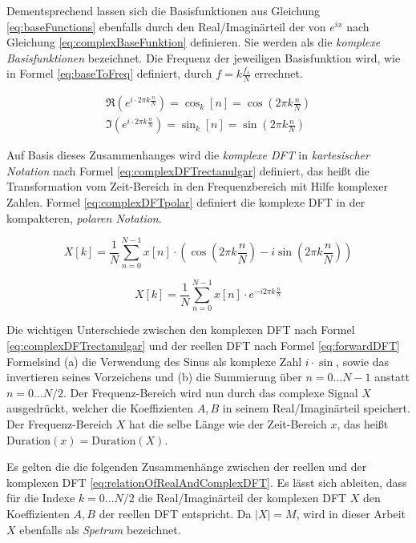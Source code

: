 Dementsprechend lassen sich die Basisfunktionen aus Gleichung \ref{eq:baseFunctions} ebenfalls durch den Real/Imaginärteil der von $e^{ix}$ nach Gleichung \ref{eq:complexBaseFunktion} definieren. Sie werden als die \emph{komplexe Basisfunktionen} bezeichnet. Die Frequenz der jeweiligen Basisfunktion wird, wie in Formel \ref{eq:baseToFreq} definiert, durch  $f = k\frac{f_s}{N}$ errechnet. 

\begin{equation}
\begin{gathered}
\Re(e^{i\cdot 2\pi k \frac{n}{N}}) = \cos_k[n] = \cos(2\pi k \frac{n}{N}) \\
\Im(e^{i\cdot 2\pi k \frac{n}{N}}) = \sin_k[n] = \sin(2\pi k \frac{n}{N})
\end{gathered}
\label{eq:complexBaseFunktion}
\end{equation}

Auf Basis dieses Zusammenhanges wird die \emph{komplexe DFT} in \emph{kartesischer Notation} nach Formel \ref{eq:complexDFTrectanulgar} definiert, das heißt die Transformation vom Zeit-Bereich in den Frequenzbereich mit Hilfe komplexer Zahlen. Formel \ref{eq:complexDFTpolar} definiert die komplexe DFT in der kompakteren, \emph{polaren Notation}. \cite[S. 570]{dspGuide}

\begin{equation}
\label{eq:complexDFTrectanulgar}
X[k] = \frac{1}{N} \sum_{n = 0}^{N-1}  x[n] \cdot (\cos (2\pi k \frac{n}{N}) -i \sin (2 \pi k \frac{n}{N}) )
\end{equation}

\begin{equation}
\label{eq:complexDFTpolar}
X[k] =  \frac{1}{N} \sum_{n = 0}^{N-1}  x[n] \cdot e^{-i 2\pi k \frac{n}{N}}
\end{equation}

Die wichtigen Unterschiede zwischen den komplexen DFT nach Formel  \ref{eq:complexDFTrectanulgar} und der reellen DFT nach Formel \ref{eq:forwardDFT} Formelsind (a) die Verwendung des Sinus als komplexe Zahl $i \cdot \sin$, sowie das invertieren seines Vorzeichens und (b) die Summierung über $n = 0\ldots N-1 $ anstatt $n = 0 \ldots N/2$. Der Frequenz-Bereich wird nun durch das complexe Signal $X$ ausgedrückt, welcher die Koeffizienten $A,B$ in seinem Real/Imaginärteil speichert. Der Frequenz-Bereich $X$ hat die selbe Länge wie der Zeit-Bereich $x$, das heißt $\text{Duration}(x) = \text{Duration}(X)$. \cite[S. 571]{dspGuide}

Es gelten die die folgenden Zusammenhänge zwischen der reellen und der komplexen DFT \ref{eq:relationOfRealAndComplexDFT}. Es lässt sich ableiten, dass für die Indexe $k = 0 \ldots N/2$ die Real/Imaginärteil der komplexen DFT $X$ den Koeffizienten $A,B$ der reellen DFT entspricht. Da $|X| = M$, wird in dieser Arbeit $X$ ebenfalls als \emph{Spetrum} bezeichnet. \cite[S. 225 - 226, 555]{dspGuide}

